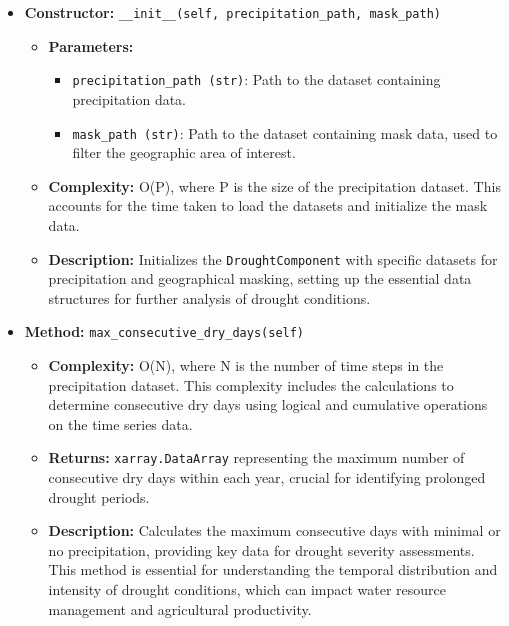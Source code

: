 \documentclass[a4paper,12pt]{article}
\begin{document}
\begin{itemize}
    \item \textbf{Constructor:} \texttt{\_\_init\_\_(self, precipitation\_path, mask\_path)}
    \begin{itemize}
        \item \textbf{Parameters:}
        \begin{itemize}
            \item \texttt{precipitation\_path (str)}: Path to the dataset containing precipitation data.
            \item \texttt{mask\_path (str)}: Path to the dataset containing mask data, used to filter the geographic area of interest.
        \end{itemize}
        \item \textbf{Complexity:} O(P), where P is the size of the precipitation dataset. This accounts for the time taken to load the datasets and initialize the mask data.
        \item \textbf{Description:} Initializes the \texttt{DroughtComponent} with specific datasets for precipitation and geographical masking, setting up the essential data structures for further analysis of drought conditions.
    \end{itemize}

    \item \textbf{Method:} \texttt{max\_consecutive\_dry\_days(self)}
    \begin{itemize}
        \item \textbf{Complexity:} O(N), where N is the number of time steps in the precipitation dataset. This complexity includes the calculations to determine consecutive dry days using logical and cumulative operations on the time series data.
        \item \textbf{Returns:} \texttt{xarray.DataArray} representing the maximum number of consecutive dry days within each year, crucial for identifying prolonged drought periods.
        \item \textbf{Description:} Calculates the maximum consecutive days with minimal or no precipitation, providing key data for drought severity assessments. This method is essential for understanding the temporal distribution and intensity of drought conditions, which can impact water resource management and agricultural productivity.
    \end{itemize}


\end{itemize}
\end{document}
